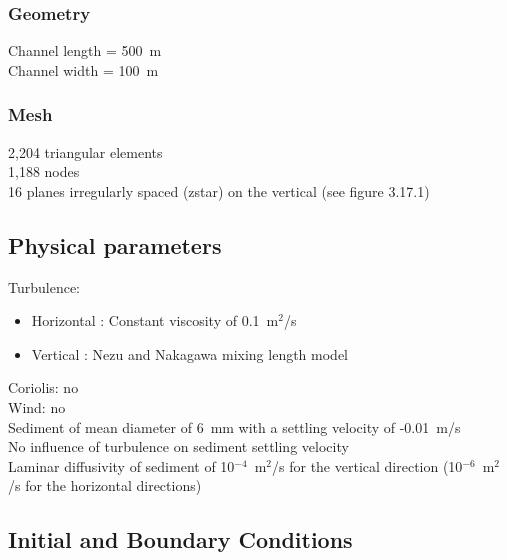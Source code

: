 \subsubsection{Geometry}
%
Channel length = 500~m\\
Channel width = 100~m
%
\subsubsection{Mesh}
%
2,204 triangular elements\\
1,188 nodes\\
16 planes irregularly spaced (zstar) on the vertical (see figure 3.17.1)
%
%
%
\subsection{Physical parameters}
%
Turbulence:
\begin{itemize}
\item Horizontal : Constant viscosity of 0.1~m$^2$/s\\
\item Vertical : Nezu and Nakagawa mixing length model
\end{itemize}
Coriolis: no\\
Wind: no\\
Sediment of mean diameter of 6~mm with a settling velocity of
-0.01~m/s\\
No influence of turbulence on sediment settling velocity\\
Laminar diffusivity of sediment of 10$^{-4}$~m$^2$/s for the vertical
direction (10$^{-6}$~m$^2$/s for the horizontal directions)
%
%
%
%
%
%
\subsection{Initial and Boundary Conditions}
%
